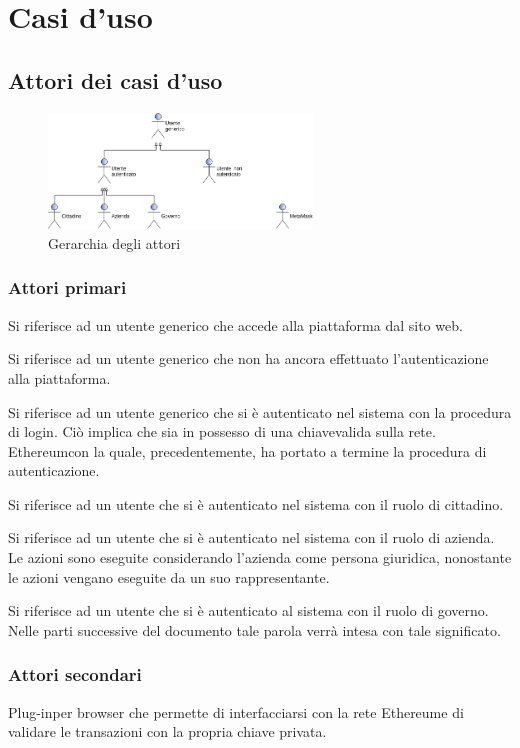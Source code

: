 \section{Casi d'uso} 
\subsection{Attori dei casi d'uso}
\begin{figure}[h]
	\includegraphics[width=7cm]{res/images/attori_primari.png}
	\centering
	\caption{Gerarchia degli attori}
\end{figure}
\subsubsection{Attori primari}
\begin{description}[style=nextline]
	\item[Utente generico]
	Si riferisce ad un utente generico che accede alla piattaforma dal sito web.
	\item[Utente non autenticato]
	Si riferisce ad un utente generico che non ha ancora effettuato l'autenticazione alla piattaforma.
	\item[Utente autenticato]
	Si riferisce ad un utente generico che si è autenticato nel sistema con la procedura di login. Ciò implica che sia in possesso di una chiave\glosp valida sulla rete. Ethereum\glosp con la quale, precedentemente, ha portato a termine la procedura di autenticazione.
	\item[Cittadino] Si riferisce ad un utente che si è autenticato nel sistema con il ruolo di cittadino.
	\item[Azienda] Si riferisce ad un utente che si è autenticato nel sistema con il ruolo di azienda. Le azioni sono eseguite considerando l'azienda come persona giuridica, nonostante le azioni vengano eseguite da un suo rappresentante.
	\item[Governo\glosp] Si riferisce ad un utente che si è autenticato al sistema con il ruolo di governo\glo. Nelle parti successive del documento tale parola verrà intesa con tale significato.
\end{description}
\subsubsection{Attori secondari}
\begin{description}[style=nextline]
	\item[MetaMask]
	Plug-in\glosp per browser che permette di interfacciarsi con la rete Ethereum\glosp e di validare le transazioni con la propria chiave privata.
	
\end{description}

